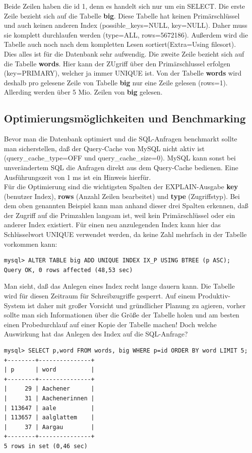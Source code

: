 Beide Zeilen haben die id 1, denn es handelt sich nur um ein SELECT. Die erste Zeile bezieht sich auf die Tabelle \textbf{big}. Diese Tabelle hat keinen Primärschlüssel und auch keinen anderen Index (possible\_keys=NULL, key=NULL). Daher muss sie komplett durchlaufen werden (type=ALL, rows=5672186). Außerdem wird die Tabelle auch noch nach dem kompletten Lesen sortiert(Extra=Using filesort). Dies alles ist für die Datenbank sehr aufwendig. Die zweite Zeile bezieht sich auf die Tabelle \textbf{words}. Hier kann der ZUgriff über den Primärschlussel erfolgen (key=PRIMARY), welcher ja immer UNIQUE ist. Von der Tabelle \textbf{words} wird deshalb pro gelesene Zeile von Tabelle \textbf{big} nur eine Zeile gelesen (rows=1). Allerding werden über 5 Mio. Zeilen von \textbf{big} gelesen.

\subsection{Optimierungsmöglichkeiten und Benchmarking}
Bevor man die Datenbank optimiert und die SQL-Anfragen benchmarkt sollte man sicherstellen,
daß der Query-Cache von MySQL nicht aktiv ist (query\_cache\_type=OFF und query\_cache\_size=0). MySQL kann sonst bei unverändertem SQL die Anfragen direkt aus dem Query-Cache bedienen. Eine Ausführungszeit von 1 ms ist ein Hinweis hierfür.\\
Für die Optimierung sind die wichtigsten Spalten der EXPLAIN-Ausgabe \textbf{key} (benutzer Index), \textbf{rows} (Anzahl Zeilen bearbeitet) und \textbf{type} (Zugriffstyp).
Bei dem oben genannten Beispiel kann man anhand dieser drei Spalten erkennen, daß der Zugriff auf die Primzahlen langsam ist, weil kein Primärschlüssel oder ein anderer Index existiert.
Für einen neu anzulegenden Index kann hier das Schlüsselwort UNIQUE verwendet werden, da keine Zahl mehrfach in der Tabelle vorkommen kann:
\begin{lstlisting}
mysql> ALTER TABLE big ADD UNIQUE INDEX IX_P USING BTREE (p ASC);
Query OK, 0 rows affected (48,53 sec)
\end{lstlisting}
Man sieht, daß das Anlegen eines Index recht lange dauern kann. Die Tabelle wird für diesen Zeitraum für Schreibzugriffe gesperrt. Auf einem Produktiv-System ist daher mit großer Vorsicht und gründlicher Planung zu agieren, vorher sollte man sich Informationen über die Größe der Tabelle holen und am besten einen Probedurchlauf auf einer Kopie der Tabelle machen!
Doch welche Auswirkung hat das Anlegen des Index auf die SQL-Anfrage?
\begin{lstlisting}
mysql> SELECT p,word FROM words, big WHERE p=id ORDER BY word LIMIT 5;
+--------+---------------+
| p      | word          |
+--------+---------------+
|     29 | Aachener      |
|     31 | Aachenerinnen |
| 113647 | aale          |
| 113657 | aalglattem    |
|     37 | Aargau        |
+--------+---------------+
5 rows in set (0,46 sec)
\end{lstlisting}
